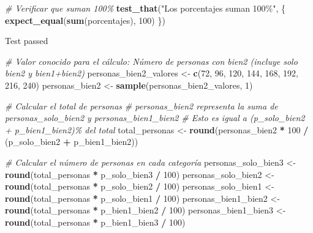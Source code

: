 \documentclass[
]{article}
\newenvironment{Shaded}{\begin{snugshade}}{\end{snugshade}}
\newcommand{\CommentTok}[1]{\textcolor[rgb]{0.56,0.35,0.01}{\textit{#1}}}
\newcommand{\DecValTok}[1]{\textcolor[rgb]{0.00,0.00,0.81}{#1}}
\newcommand{\FunctionTok}[1]{\textcolor[rgb]{0.13,0.29,0.53}{\textbf{#1}}}
\newcommand{\NormalTok}[1]{#1}
\newcommand{\OtherTok}[1]{\textcolor[rgb]{0.56,0.35,0.01}{#1}}
\newcommand{\SpecialCharTok}[1]{\textcolor[rgb]{0.81,0.36,0.00}{\textbf{#1}}}
\newcommand{\StringTok}[1]{\textcolor[rgb]{0.31,0.60,0.02}{#1}}
\begin{document}
\begin{Shaded}
\begin{Highlighting}[]
\CommentTok{\# Verificar que suman 100\%}
\FunctionTok{test\_that}\NormalTok{(}\StringTok{"Los porcentajes suman 100\%"}\NormalTok{, \{}
  \FunctionTok{expect\_equal}\NormalTok{(}\FunctionTok{sum}\NormalTok{(porcentajes), }\DecValTok{100}\NormalTok{)}
\NormalTok{\})}
\end{Highlighting}
\end{Shaded}

Test passed

\begin{Shaded}
\begin{Highlighting}[]
\CommentTok{\# Valor conocido para el cálculo: Número de personas con bien2 (incluye solo bien2 y bien1+bien2)}
\NormalTok{personas\_bien2\_valores }\OtherTok{\textless{}{-}} \FunctionTok{c}\NormalTok{(}\DecValTok{72}\NormalTok{, }\DecValTok{96}\NormalTok{, }\DecValTok{120}\NormalTok{, }\DecValTok{144}\NormalTok{, }\DecValTok{168}\NormalTok{, }\DecValTok{192}\NormalTok{, }\DecValTok{216}\NormalTok{, }\DecValTok{240}\NormalTok{)}
\NormalTok{personas\_bien2 }\OtherTok{\textless{}{-}} \FunctionTok{sample}\NormalTok{(personas\_bien2\_valores, }\DecValTok{1}\NormalTok{)}

\CommentTok{\# Calcular el total de personas}
\CommentTok{\# personas\_bien2 representa la suma de personas\_solo\_bien2 y personas\_bien1\_bien2}
\CommentTok{\# Esto es igual a (p\_solo\_bien2 + p\_bien1\_bien2)\% del total}
\NormalTok{total\_personas }\OtherTok{\textless{}{-}} \FunctionTok{round}\NormalTok{(personas\_bien2 }\SpecialCharTok{*} \DecValTok{100} \SpecialCharTok{/}\NormalTok{ (p\_solo\_bien2 }\SpecialCharTok{+}\NormalTok{ p\_bien1\_bien2))}

\CommentTok{\# Calcular el número de personas en cada categoría}
\NormalTok{personas\_solo\_bien3 }\OtherTok{\textless{}{-}} \FunctionTok{round}\NormalTok{(total\_personas }\SpecialCharTok{*}\NormalTok{ p\_solo\_bien3 }\SpecialCharTok{/} \DecValTok{100}\NormalTok{)}
\NormalTok{personas\_solo\_bien2 }\OtherTok{\textless{}{-}} \FunctionTok{round}\NormalTok{(total\_personas }\SpecialCharTok{*}\NormalTok{ p\_solo\_bien2 }\SpecialCharTok{/} \DecValTok{100}\NormalTok{)}
\NormalTok{personas\_solo\_bien1 }\OtherTok{\textless{}{-}} \FunctionTok{round}\NormalTok{(total\_personas }\SpecialCharTok{*}\NormalTok{ p\_solo\_bien1 }\SpecialCharTok{/} \DecValTok{100}\NormalTok{)}
\NormalTok{personas\_bien1\_bien2 }\OtherTok{\textless{}{-}} \FunctionTok{round}\NormalTok{(total\_personas }\SpecialCharTok{*}\NormalTok{ p\_bien1\_bien2 }\SpecialCharTok{/} \DecValTok{100}\NormalTok{)}
\NormalTok{personas\_bien1\_bien3 }\OtherTok{\textless{}{-}} \FunctionTok{round}\NormalTok{(total\_personas }\SpecialCharTok{*}\NormalTok{ p\_bien1\_bien3 }\SpecialCharTok{/} \DecValTok{100}\NormalTok{)}


\end{Highlighting}
\end{Shaded}
\end{document}
